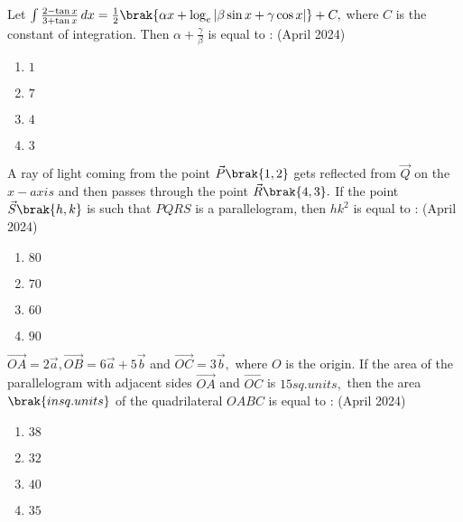 \iffalse
\title{April 2024}
\author{EE24Btech11058}
\section{mcq-single}
\fi

    \item Let $\int \frac{2 - \tan x}{3+ \tan x} \,dx = \frac{1}{2}\brak{\alpha x + \log_e |\beta \sin x + \gamma \cos x |} + C,$ where $C$ is the constant of integration. Then $\alpha + \frac{\gamma}{\beta}$ is equal to :
    \hfill(April 2024)
    \begin{enumerate}
        \item $1$
        \item $7$
        \item $4$
        \item $3$\\
    \end{enumerate}


    \item A ray of light coming from the point $\vec{P}\brak{1,2}$ gets reflected from $\vec{Q}$ on the $x-axis$ and then passes through the point $\vec{R}\brak{4,3}.$ If the point $\vec{S}\brak{h,k}$ is such that $PQRS$ is a parallelogram, then $hk^2$ is equal to :
    \hfill(April 2024)
    \begin{enumerate}
        \item $80$
        \item $70$
        \item $60$
        \item $90$\\
    \end{enumerate}

    \item $\overrightarrow{OA} = 2 \overrightarrow{a},\overrightarrow{OB} = 6\overrightarrow{a}+ 5\overrightarrow{b}$ and $\overrightarrow{OC} = 3\overrightarrow{b},$ where $O$ is the origin. If the area of the parallelogram with adjacent sides $\overrightarrow{OA}$ and $\overrightarrow{OC}$ is $15sq.units,$ then the area $\brak{in sq.units}$ of the quadrilateral $OABC$ is equal to :
    \hfill(April 2024)
    \begin{enumerate}
        \item $38$
        \item $32$
        \item $40$
        \item $35$\\
    \end{enumerate}

